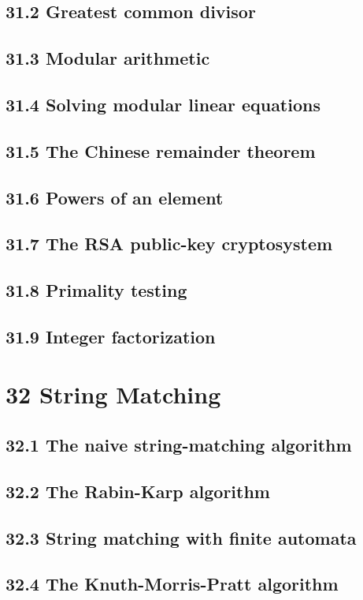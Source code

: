 \documentclass[a4paper]{article}
\begin{document}
\subsection{31.2 Greatest common divisor}
\subsection{31.3 Modular arithmetic}
\subsection{31.4 Solving modular linear equations}
\subsection{31.5 The Chinese remainder theorem}
\subsection{31.6 Powers of an element}
\subsection{31.7 The RSA public-key cryptosystem}
\subsection{31.8 Primality testing}
\subsection{31.9 Integer factorization}

\section{32 String Matching}
\subsection{32.1 The naive string-matching algorithm}
\subsection{32.2 The Rabin-Karp algorithm}
\subsection{32.3 String matching with finite automata}
\subsection{32.4 The Knuth-Morris-Pratt algorithm}
\end{document}
